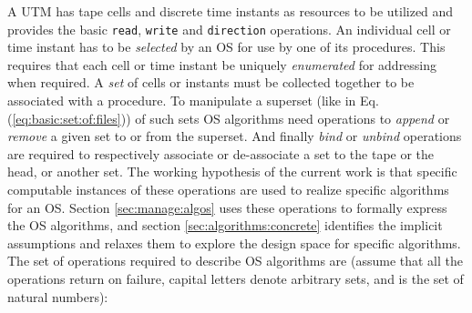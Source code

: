 \documentclass[draft]{article}
\begin{document}
A UTM  has tape cells  and discrete time  instants as resources  to be
utilized  and  provides the  basic  \texttt{read}, \texttt{write}  and
\texttt{direction} operations.  An individual cell or time instant has
to be \emph{selected} by an OS for use by one of its procedures.  This
requires that each cell  or time instant be uniquely \emph{enumerated}
for addressing when required.  A  \emph{set} of cells or instants must
be  collected  together  to   be  associated  with  a  procedure.   To
manipulate a  superset (like   in Eq.(\ref{eq:basic:set:of:files}))
of  such  sets  OS  algorithms  need operations  to  \emph{append}  or
\emph{remove}  a given  set  to  or from  the  superset.  And  finally
\emph{bind} or  \emph{unbind} operations are  required to respectively
associate or  de-associate a set to  the tape or the  head, or another
set.   The working  hypothesis of  the current  work is  that specific
computable instances of these  operations are used to realize specific
algorithms  for  an  OS.   Section \ref{sec:manage:algos}  uses  these
operations  to  formally  express   the  OS  algorithms,  and  section
\ref{sec:algorithms:concrete} identifies  the implicit assumptions and
relaxes them to explore the design space for specific algorithms.  The
set of operations required to  describe OS algorithms are (assume that
all the  operations return  on failure,  capital letters denote
arbitrary sets, and  is the set of natural numbers):
\end{document}
